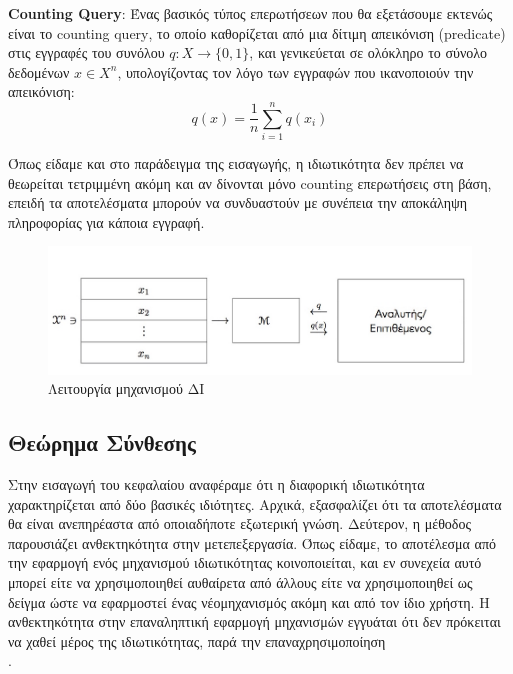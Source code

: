 \textbf{\textlatin{Counting Query}}: Ένας βασικός τύπος επερωτήσεων που θα εξετάσουμε εκτενώς είναι το \textlatin{counting query}, το οποίο καθορίζεται από μια δίτιμη απεικόνιση (\textlatin{predicate}) στις εγγραφές του συνόλου $q:X \longrightarrow \{0,1\}$, και γενικεύεται σε ολόκληρο το σύνολο δεδομένων $x \in X^n$, υπολογίζοντας τον λόγο των εγγραφών που ικανοποιούν την απεικόνιση: 
$$q(x)=\frac{1}{n}{\sum_{i=1}^{n} q(x_i)}$$



Όπως είδαμε και στο παράδειγμα της εισαγωγής, η ιδιωτικότητα δεν πρέπει να θεωρείται τετριμμένη ακόμη και αν δίνονται μόνο \textlatin{counting} επερωτήσεις στη βάση, επειδή τα αποτελέσματα μπορούν να συνδυαστούν με συνέπεια την αποκάληψη πληροφορίας για κάποια εγγραφή.

\begin{figure} [ht]
\begin{center}
  \includegraphics[scale=0.4]{images/M.jpg}
  \caption{Λειτουργία μηχανισμού ΔΙ}
  \end{center}
\end{figure}



\subsection{Θεώρημα Σύνθεσης}

Στην εισαγωγή του κεφαλαίου αναφέραμε ότι η διαφορική ιδιωτικότητα χαρακτηρίζεται από δύο βασικές ιδιότητες. Αρχικά, εξασφαλίζει ότι τα αποτελέσματα θα είναι ανεπηρέαστα από οποιαδήποτε εξωτερική γνώση. Δεύτερον, η μέθοδος παρουσιάζει ανθεκτηκότητα στην μετεπεξεργασία. Όπως είδαμε, το αποτέλεσμα από την εφαρμογή ενός μηχανισμού ιδιωτικότητας κοινοποιείται, και εν συνεχεία αυτό μπορεί είτε να χρησιμοποιηθεί αυθαίρετα από άλλους είτε να χρησιμοποιηθεί ως δείγμα ώστε να εφαρμοστεί ένας νέομηχανισμός ακόμη και από τον ίδιο χρήστη. Η ανθεκτηκότητα στην επαναληπτική εφαρμογή μηχανισμών εγγυάται ότι δεν πρόκειται να χαθεί μέρος της ιδιωτικότητας, παρά την επαναχρησιμοποίηση\\
\textlatin{\cite{Dwork:2010:BDP:1917827.1918366}}.

